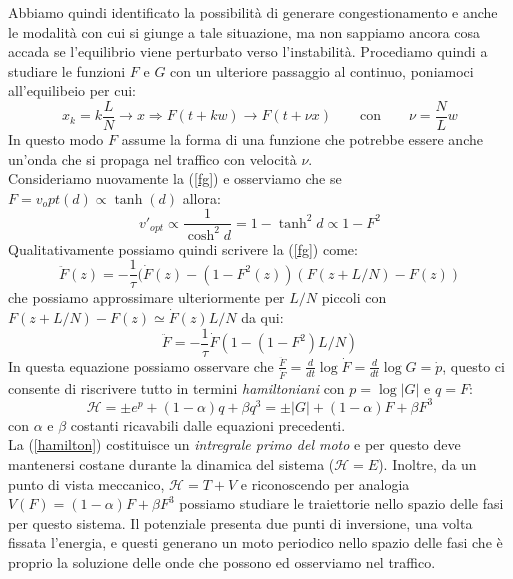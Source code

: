 Abbiamo quindi identificato la possibilità di generare congestionamento e anche le modalità con cui si giunge a tale situazione, ma non sappiamo ancora cosa accada se l'equilibrio viene perturbato verso l'instabilità. Procediamo quindi a studiare le funzioni $F$ e $G$ con un ulteriore passaggio al continuo, poniamoci all'equilibeio per cui:
\begin{equation}
	x_k=k\frac{L}{N}\rightarrow x \Rightarrow F(t+kw)\rightarrow F(t+\nu x)\qquad \text{con}\qquad \nu=\frac{N}{L}w
\end{equation}
In questo modo $F$ assume la forma di una funzione che potrebbe essere anche un'onda che si propaga nel traffico con velocità $\nu$.\\
Consideriamo nuovamente la (\ref{fg}) e osserviamo che se $F=v_opt(d)\propto\tanh(d)$ allora:
\begin{equation*}
	v'_{opt}\propto\frac{1}{\cosh^2d}=1-\tanh^2d\propto1-F^2
\end{equation*} 
Qualitativamente possiamo quindi scrivere la (\ref{fg}) come:
\begin{equation*}
	\ddot{F}(z)=-\frac{1}{\tau}(\dot{F}(z)-(1-F^2(z))(F(z+L/N)-F(z))
\end{equation*}
che possiamo approssimare ulteriormente per $L/N$ piccoli con $F(z+L/N)-F(z)\simeq \dot{F}(z)L/N$ da qui:
\begin{equation}
\ddot{F}=-\frac{1}{\tau}\dot{F}(1-(1-F^2)L/N)
\end{equation}
In questa equazione possiamo osservare che $\frac{\ddot{F}}{\dot{F}}=\frac{d}{dt}\log\dot{F}=\frac{d}{dt}\log G=\dot{p}$, questo ci consente di riscrivere tutto in termini \textit{hamiltoniani} con $p=\log|G|$ e $q=F$:
\begin{equation}
\mathcal{H}=\pm e^p+(1-\alpha)q+\beta q^3=\pm|G|+(1-\alpha)F+\beta F^3
\label{hamilton}
\end{equation} 
con $\alpha$ e $\beta$ costanti ricavabili dalle equazioni precedenti.\\

La (\ref{hamilton}) costituisce un \textit{intregrale primo del moto} e per questo deve mantenersi costane durante la dinamica del sistema ($\mathcal{H}=E$). Inoltre, da un punto di vista meccanico, $\mathcal{H}=T+V$ e riconoscendo per analogia $V(F)=(1-\alpha)F+\beta F^3$ possiamo studiare le traiettorie nello spazio delle fasi per questo sistema. Il potenziale presenta due punti di inversione, una volta fissata l'energia, e questi generano un moto periodico nello spazio delle fasi che è proprio la soluzione delle onde che possono ed osserviamo nel traffico.

